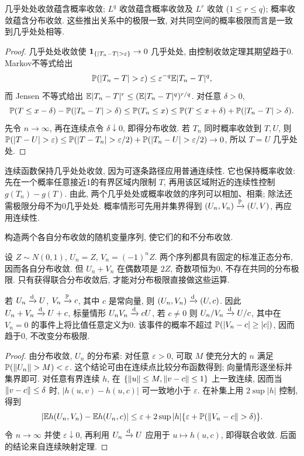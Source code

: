 \begin{proposition}[收敛间的关系]
几乎处处收敛蕴含概率收敛; $L^q$ 收敛蕴含概率收敛及 $L^r$ 收敛 ($1\le r\le q$); 概率收敛蕴含分布收敛. 这些推出关系中的极限一致, 对共同空间的概率极限而言是一致到几乎处处相等.
\end{proposition}
\begin{proof}
几乎处处收敛使 $\ind_{\{|T_n-T|>\varepsilon\}}\to0$ 几乎处处, 由控制收敛定理其期望趋于0. Markov不等式给出
\[
 \PP(|T_n-T|>\varepsilon)\le\varepsilon^{-q}\E|T_n-T|^q,
\]
而 Jensen 不等式给出 $\mathbb E|T_n-T|^r\le(\mathbb E|T_n-T|^q)^{r/q}$. 对任意 $\delta>0$,
\[
 \PP(T\le x-\delta)-\PP(|T_n-T|>\delta)
 \le\PP(T_n\le x)
 \le\PP(T\le x+\delta)+\PP(|T_n-T|>\delta).
\]
先令 $n\to\infty$, 再在连续点令 $\delta\downarrow0$, 即得分布收敛. 若 $T_n$ 同时概率收敛到 $T,U$, 则
$\PP(|T-U|>\varepsilon)\le\PP(|T-T_n|>\varepsilon/2)+\PP(|T_n-U|>\varepsilon/2)\to0$, 所以 $T=U$ 几乎处处.
\end{proof}

连续函数保持几乎处处收敛, 因为可逐条路径应用普通连续性. 它也保持概率收敛: 先在一个概率任意接近1的有界区域内限制 $T$, 再用该区域附近的连续性控制 $g(T_n)-g(T)$. 由此, 两个几乎处处或概率收敛的序列可以相加、相乘; 除法还需极限分母不为0几乎处处. 概率情形可先用并集界得到 $(U_n,V_n)\xrightarrow{\mathbb P}(U,V)$, 再应用连续性.

\begin{example}
构造两个各自分布收敛的随机变量序列, 使它们的和不分布收敛.
\end{example}
\begin{solution}
设 $Z\sim N(0,1)$, $U_n=Z$, $V_n=(-1)^nZ$. 两个序列都具有固定的标准正态分布, 因而各自分布收敛. 但 $U_n+V_n$ 在偶数项是 $2Z$, 奇数项恒为0, 不存在共同的分布极限. 只有获得联合分布收敛后, 才能对分布极限直接做这些运算.
\end{solution}

\begin{theorem}[Slutsky定理]
若 $U_n\xrightarrow{\mathrm d} U$, $V_n\xrightarrow{\mathbb P} c$, 其中 $c$ 是常向量, 则 $(U_n,V_n)\xrightarrow{\mathrm d}(U,c)$. 因此 $U_n+V_n\xrightarrow{\mathrm d} U+c$, 标量情形 $U_nV_n\xrightarrow{\mathrm d} cU$, 若 $c\ne0$ 则 $U_n/V_n\xrightarrow{\mathrm d} U/c$, 其中在 $V_n=0$ 的事件上将比值任意定义为0. 该事件的概率不超过 $\mathbb P(|V_n-c|\ge|c|)$, 因而趋于0, 不改变分布极限.
\end{theorem}
\begin{proof}
由分布收敛, $U_n$ 的分布紧: 对任意 $\varepsilon>0$, 可取 $M$ 使充分大的 $n$ 满足 $\mathbb P(\lVert U_n\rVert>M)<\varepsilon$. 这个结论可由在连续点比较分布函数得到; 向量情形逐坐标并集界即可. 对任意有界连续 $h$, 在 $\{\lVert u\rVert\le M,\lVert v-c\rVert\le1\}$ 上一致连续, 因而当 $\lVert v-c\rVert\le\delta$ 时, $|h(u,v)-h(u,c)|$ 可一致地小于 $\varepsilon$. 在补集上用 $2\sup|h|$ 控制, 得到
\[
 |\mathbb E h(U_n,V_n)-\mathbb E h(U_n,c)|
 \le\varepsilon+2\sup|h|\{\varepsilon+\mathbb P(\lVert V_n-c\rVert>\delta)\}.
\]
令 $n\to\infty$ 并使 $\varepsilon\downarrow0$, 再利用 $U_n\xrightarrow{\mathrm d} U$ 应用于 $u\mapsto h(u,c)$, 即得联合收敛. 后面的结论来自连续映射定理.
\end{proof}

